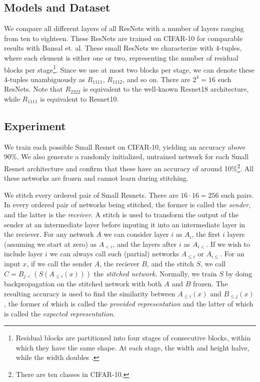 \documentclass{article}
\begin{document}
\subsection{Models and Dataset}
We compare all different
layers of all ResNets with a number of layers ranging from ten to eighteen.
These ResNets are trained on CIFAR-10 for comparable results
with Bansal et. al. These small ResNets we characterize with 4-tuples, where 
each element is either one or two, representing the number of residual blocks per stage\footnote{
   Residual blocks are partitioned into four stages of consecutive blocks, within which they have the same shape. At each stage, the
   width and height halve, while the width doubles \cite{He2016DeepRL}.
}. Since we use at most two blocks per stage, we can denote these 4-tuples unambiguously as
$R_{1111}$, $R_{1112}$, and so on. There are $2^4 = 16$ such ResNets. Note that $R_{2222}$ is equivalent
to the well-known Resnet18 architecture, while $R_{1111}$ is equivalent to Resnet10.

\subsection{Experiment}
We train each possible Small Resnet on CIFAR-10, yielding an accuracy above 90\%. We also
generate a randomly initialized, untrained network for each Small Resnet architecture and confirm
that these have an accuracy of around 10\%\footnote{There are ten classes in CIFAR-10.}. All these
networks are frozen and cannot learn during stitching.

We stitch every ordered pair of Small Resnets. There are $16 \cdot 16 = 256$ such pairs.
In every ordered pair of networks being stitched, the former is called the \textit{sender}, and the latter
is the \textit{receiver}. A stitch is used to transform the output of the sender at an intermediate layer
before inputing it into an intermediate layer in the reciever. For any network $A$ we can consider 
layer $i$ as $A_i$, the first $i$  layers (assuming we start at zero) as $A_{<i}$, and the layers 
after $i$ as $A_{i<}$. If we wish to include layer $i$ we can always call such (partial) networks
$A_{\leq i}$ or $A_{i\leq}$. For an input $x$, if we call the sender $A$, the reciever $B$,
and the stitch $S$, we call $C = B_{j<}(S(A_{\leq i}(x)))$ the \textit{stitched network}. Normally,
we train $S$ by doing backpropagation on the stitched network with both $A$ and $B$ frozen. The
resulting accuracy is used to find the similarity between $A_{\leq i}(x)$ and $B_{\leq j}(x)$, the
former of which is called the \textit{provided representation} and the latter of which is called
the \textit{expected representation}.
\end{document}
